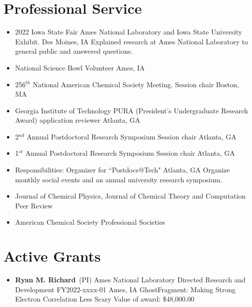 \documentclass[11pt,a4paper,sans]{moderncv}
\begin{document}
\section{Professional Service}
\vspace{5pt}
\begin{itemize}
	\item{
	      {2022 Iowa State Fair}
		  {Ames National Laboratory and Iowa State University Exhibit.}
		  {Des Moines, IA}
		  {}
		  {Explained research at Ames National Laboratory to general public and
		   answered questions.}}

	\item{
          {National Science Bowl}
          {Volunteer}
          {Ames, IA}
          {}
          {}}
	\item{
          {256$^{th}$ National American Chemical Society Meeting.}
          {Session chair}
          {Boston, MA}
          {}
          {}}
	\item{
          {Georgia Institute of Technology}
          {PURA (President's Undergraduate Research Award) application reviewer}
          {Atlanta, GA}
          {}
          {}}
	\item{
         {2$^{nd}$ Annual Postdoctoral Research Symposium}
         {Session chair}
         {Atlanta, GA}
         {}
         {}}
	\item{
          {1$^{st}$ Annual Postdoctoral Research Symposium}
          {Session chair}
          {Atlanta, GA}
          {}
          {}}
	\item{
        {Responsibilities:}
        { Organizer for ``Postdocs@Tech"}
        {Atlanta, GA}
        {}
        {Organize monthly social events and an annual university research symposium.}}
	\item{\cventry{}
          {Journal of Chemical Physics, Journal of Chemical Theory and
          Computation}
          {Peer Review}
		  {}
          {}
          {}}
	\item{\cventry{}
          {American Chemical Society}
          {Professional Societies}
          {}
          {}
          {}}
\end{itemize}


\section{Active Grants}
\vspace{5pt}
\begin{itemize}
	\item{
		{\textbf{Ryan M. Richard}\ (PI)}
		{Ames National Laboratory Directed Research and Development
         FY2022-xxxx-01}
		{Ames, IA}
		{}
		{GhostFragment: Making Strong Electron Correlation Less Scary}
		{Value of award: \$48,000.00}
		{}
	}
\end{itemize}
\end{document}
